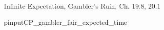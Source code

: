 \documentclass[handout]{mcs}
\begin{document}


\begin{staffnotes}
Infinite Expectation, Gambler's Ruin, Ch. 19.8, 20.1
\end{staffnotes}


\begin{staffnotes}
pinput{CP\_gambler\_fair\_expected\_time}
\end{staffnotes}

\end{document}
